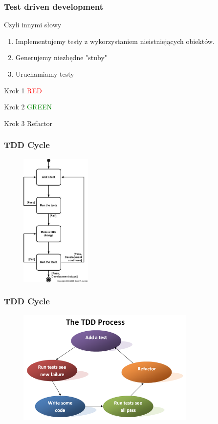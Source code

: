 \documentclass[slidestop,compress,mathserif]{beamer}
\begin{document}
\begin{frame}
\frametitle{Test driven development}
Czyli innymi słowy
 \begin{enumerate}
\item Implementujemy testy z wykorzystaniem nieistniejących obiektów.
\pause \item Generujemy niezbędne "stuby"
\pause \item Uruchamiamy testy
\end{enumerate}
\pause
\begin{block}{Krok 1}
	\textcolor{red}{RED}
\end{block}
\pause
\begin{block}{Krok 2}
	\textcolor{green}{GREEN}
\end{block}
\pause
\begin{block}{Krok 3}
 Refactor
\end{block}
\end{frame}

\begin{frame}
 \frametitle{TDD Cycle}
\begin{figure}
 \centering
 \includegraphics[height=190pt]{tddSteps.jpg}
\end{figure}
\end{frame}

\begin{frame}
 \frametitle{TDD Cycle}
\begin{figure}
 \centering
 \includegraphics[width=250pt]{tddSteps.png}
\end{figure}
\end{frame}
\end{document}
